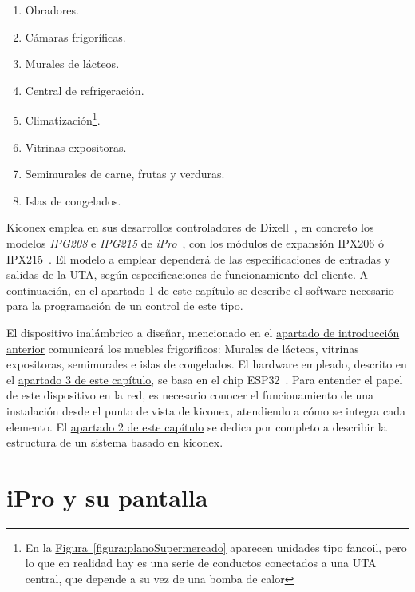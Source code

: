 \begin{enumerate}
  \item Obradores.
  \item Cámaras frigoríficas.
  \item Murales de lácteos.
  \item Central de refrigeración.
  \item Climatización\footnote[1]{En la \hyperref[figura:planoSupermercado]{Figura~\ref{figura:planoSupermercado}} aparecen unidades tipo fancoil, pero lo que en realidad hay es una serie de conductos conectados a una UTA central, que depende a su vez de una bomba de calor}.
  \item Vitrinas expositoras.
  \item Semimurales de carne, frutas y verduras.
  \item Islas de congelados.
\end{enumerate}

Kiconex emplea en sus desarrollos controladores de Dixell~\cite{marcaDixell}, en concreto los modelos \textit{IPG208} e \textit{IPG215} de \textit{iPro}~\cite{iproManual}, con los módulos de expansión IPX206 ó IPX215~\cite{iproManual}. El modelo a emplear dependerá de las especificaciones de entradas y salidas de la UTA, según especificaciones de funcionamiento del cliente. A continuación, en el \hyperref[sec:kiconex]{apartado 1 de este capítulo} se describe el software necesario para la programación de un control de este tipo.

El dispositivo inalámbrico a diseñar, mencionado en el \hyperref[chap:intro]{apartado de introducción anterior} comunicará los muebles frigoríficos: Murales de lácteos, vitrinas expositoras, semimurales e islas de congelados. El hardware empleado, descrito en el \hyperref[sec:esp32poe]{apartado 3 de este capítulo}, se basa en el chip ESP32~\cite{esp32Espressif}. Para entender el papel de este dispositivo en la red, es necesario conocer el funcionamiento de una instalación desde el punto de vista de kiconex, atendiendo a cómo se integra cada elemento. El \hyperref[sec:kiconex]{apartado 2 de este capítulo} se dedica por completo a describir la estructura de un sistema basado en kiconex.


\break
\section{iPro y su pantalla}
\label{sec:iproypantalla}

